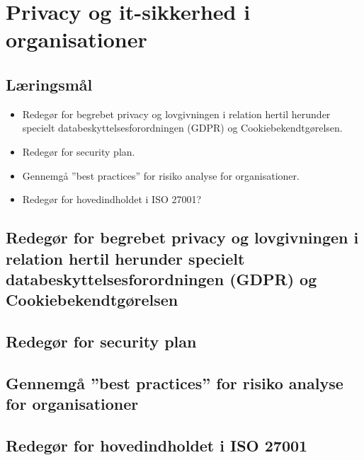 \section{Privacy og it-sikkerhed i organisationer}

\subsection{Læringsmål}

\begin{itemize}
	\item Redegør for begrebet privacy og lovgivningen i relation hertil herunder specielt databeskyttelsesforordningen (GDPR) og Cookiebekendtgørelsen.
	\item Redegør for security plan.
	\item Gennemgå ''best practices'' for risiko analyse for organisationer.
	\item Redegør for hovedindholdet i ISO 27001?
\end{itemize}

\subsection{Redegør for begrebet privacy og lovgivningen i relation hertil herunder specielt databeskyttelsesforordningen (GDPR) og Cookiebekendtgørelsen}
\subsection{Redegør for security plan}
\subsection{Gennemgå ''best practices'' for risiko analyse for organisationer}
\subsection{Redegør for hovedindholdet i ISO 27001}
